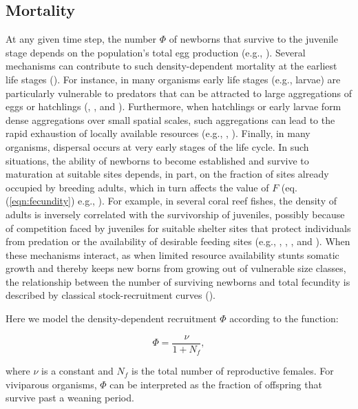 \documentclass[11pt]{article}
\begin{document}
\begin{linenumbers}
\subsection*{Mortality}
\indent At any given time step, the number $\Phi$ of newborns that survive to the juvenile stage depends on the population's total egg production (e.g., \citealt{wootton98}). Several mechanisms can contribute to such density-dependent mortality at the earliest life stages (\citealt{shepherd80}). For instance, in many organisms early life stages (e.g., larvae) are particularly vulnerable to predators that can be attracted to large aggregations of eggs or hatchlings (\citealt{martin93}, \citealt{bellinato95}, and \citealt{white07}). Furthermore, when hatchlings or early larvae form dense aggregations over small spatial scales, such aggregations can lead to the rapid exhaustion of locally available resources (e.g., \citealt{leggett94}, \citealt{arino98}). Finally, in many organisms,  dispersal occurs at very early stages of the life cycle. In such situations, the ability of newborns to become established and survive to maturation at suitable sites depends, in part, on the fraction of sites already occupied by breeding adults, which in turn affects the value of $F$ (eq. (\ref{eqn:fecundity}) e.g., \citealt{caley96}). For example, in several coral reef fishes, the density of adults is inversely correlated with the survivorship of juveniles, possibly because of competition faced by juveniles for suitable shelter sites that protect individuals from predation or the availability of desirable feeding sites (e.g., \citealt{sale76}, \citealt{forrester95}, \citealt{caley96}, and \citealt{wilson02}). When these mechanisms interact, as when limited resource availability stunts somatic growth and thereby keeps new borns from growing out of vulnerable size classes, the relationship between the number of surviving newborns and total fecundity is described by classical stock-recruitment curves (\citealt{shepherd80}).

Here we model the density-dependent recruitment $\Phi$ according to the function:
\begin{linenomath}
\begin{equation}
\Phi = \frac{\nu}{1+N_f},
\end{equation}
\end{linenomath}
where $\nu$ is a constant and $N_f$ is the total number of reproductive females. For viviparous organisms, $\Phi$ can be interpreted as the fraction of offspring that survive past a weaning period. 


\end{linenumbers}
\end{document}
